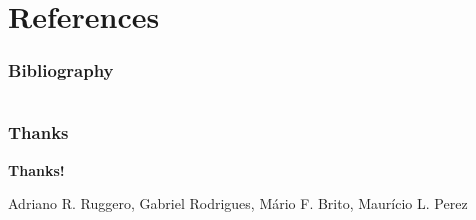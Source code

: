 \documentclass[notes]{beamer}
\begin{document}
\section{References}
\begin{frame} [allowframebreaks]

\frametitle{Bibliography}




\end{frame}

\section{}
\begin{frame}
\frametitle{Thanks}
\vskip30pt

\begin{center}
{\bf \color{alert} Thanks!}
\end{center}

\vskip30pt

\begin{center}

\vskip12pt

Adriano R. Ruggero, Gabriel Rodrigues, Mário F. Brito, Maurício L. Perez

\end{center}

\end{frame}
\end{document}
